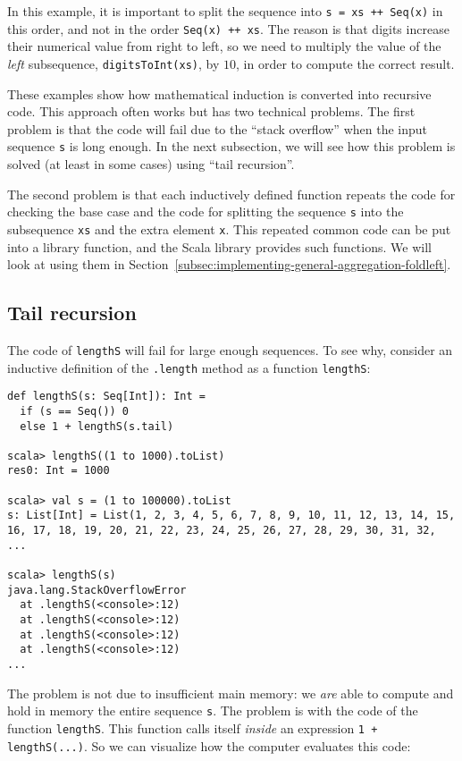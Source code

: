 \noindent In this example, it is important to split the sequence into
\lstinline!s = xs ++ Seq(x)! in this order, and not in the order
\lstinline!Seq(x) ++ xs!. The reason is that digits increase their
numerical value from right to left, so we need to multiply the value
of the \emph{left} subsequence, \lstinline!digitsToInt(xs)!, by $10$,
in order to compute the correct result.

These examples show how mathematical induction is converted into recursive
code. This approach often works but has two technical problems. The
first problem is that the code will fail due to the ``stack overflow''
when the input sequence \lstinline!s! is long enough. In the next
subsection, we will see how this problem is solved (at least in some
cases) using ``tail recursion''. 

The second problem is that each inductively defined function repeats
the code for checking the base case and the code for splitting the
sequence \lstinline!s! into the subsequence \lstinline!xs! and the
extra element \lstinline!x!. This repeated common code can be put
into a library function, and the Scala library provides such functions.
We will look at using them in Section~\ref{subsec:implementing-general-aggregation-foldleft}.

\subsection{Tail recursion\label{subsec:Tail-recursion}}

The code of \lstinline!lengthS! will fail for large enough sequences.
To see why, consider an inductive definition of the \lstinline!.length!
method as a function \lstinline!lengthS!:
\begin{lstlisting}
def lengthS(s: Seq[Int]): Int =
  if (s == Seq()) 0
  else 1 + lengthS(s.tail)

scala> lengthS((1 to 1000).toList)
res0: Int = 1000

scala> val s = (1 to 100000).toList
s: List[Int] = List(1, 2, 3, 4, 5, 6, 7, 8, 9, 10, 11, 12, 13, 14, 15, 16, 17, 18, 19, 20, 21, 22, 23, 24, 25, 26, 27, 28, 29, 30, 31, 32, ...

scala> lengthS(s)
java.lang.StackOverflowError
  at .lengthS(<console>:12)
  at .lengthS(<console>:12)
  at .lengthS(<console>:12)
  at .lengthS(<console>:12)
...
\end{lstlisting}
The problem is not due to insufficient main memory: we \emph{are}
able to compute and hold in memory the entire sequence \lstinline!s!.
The problem is with the code of the function \lstinline!lengthS!.
This function calls itself \emph{inside} an expression \lstinline!1 + lengthS(...)!.
So we can visualize how the computer evaluates this code:

